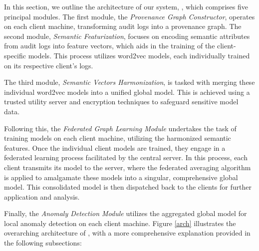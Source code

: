 In this section, we outline the architecture of our system, \Sys, which comprises five principal modules. The first module, the \textit{Provenance Graph Constructor}, operates on each client machine, transforming audit logs into a provenance graph. The second module, \textit{Semantic Featurization}, focuses on encoding semantic attributes from audit logs into feature vectors, which aids in the training of the client-specific \gnnshort models. This process utilizes word2vec models, each individually trained on its respective client's logs.

The third module, \textit{Semantic Vectors Harmonization}, is tasked with merging these individual word2vec models into a unified global model. This is achieved using a trusted utility server and encryption techniques to safeguard sensitive model data. 

Following this, the \textit{Federated Graph Learning Module} undertakes the task of training \gnnshort models on each client machine, utilizing the harmonized semantic features. Once the individual client models are trained, they engage in a federated learning process facilitated by the central server. In this process, each client transmits its model to the server, where the federated averaging algorithm is applied to amalgamate these models into a singular, comprehensive global model. This consolidated model is then dispatched back to the clients for further application and analysis.

Finally, the \textit{Anomaly Detection Module} utilizes the aggregated global model for local anomaly detection on each client machine. Figure \ref{arch} illustrates the overarching architecture of \Sys, with a more comprehensive explanation provided in the following subsections:


